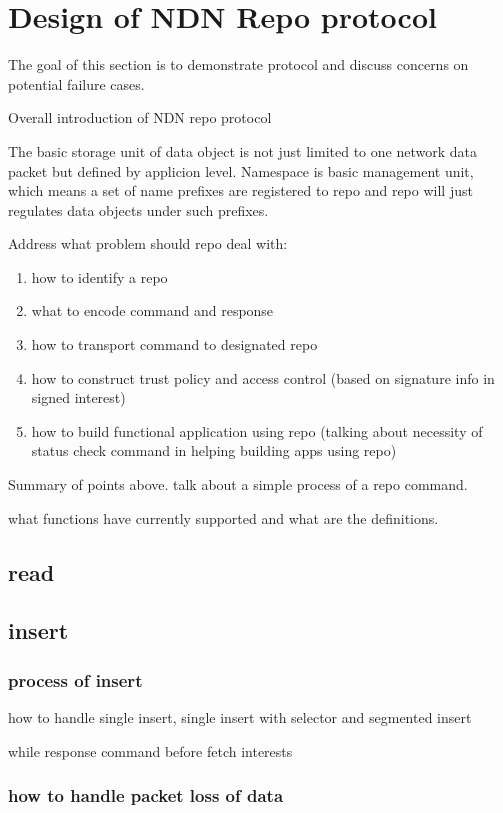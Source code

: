 \documentclass[conference]{IEEEtran}
\begin{document}
\section{Design of NDN Repo protocol} \label{section-design}
The goal of this section is to demonstrate protocol and discuss concerns on potential failure cases.

Overall introduction of NDN repo protocol

The basic storage unit of data object is not just limited to one network data packet but defined by applicion level. Namespace is basic management unit, which means a set of name prefixes are registered to repo and repo will just regulates data objects under such prefixes.

Address what problem should repo deal with:
\begin{enumerate}
\item how to identify a repo
\item what to encode command and response
\item how to transport command to designated repo
\item how to construct trust policy and access control (based on signature info in signed interest)
\item how to build functional application using repo (talking about necessity of status check command in helping building apps using repo)
\end{enumerate}

Summary of points above. talk about a simple process of a repo command.



what functions have currently supported and what are the definitions.

\subsection{read}

\subsection{insert}
\subsubsection{process of insert}
how to handle single insert, single insert with selector and segmented insert

while response command before fetch interests

\subsubsection{how to handle packet loss of data}
\end{document}
